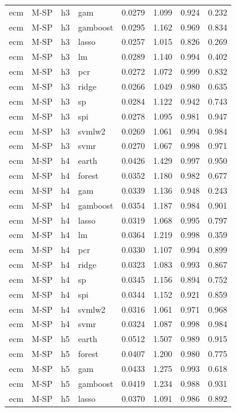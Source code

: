 \begin{ThreePartTable}
\begin{longtable}[t]{llclcccc}
ecm & M-SP & h3 & gam & 0.0279 & 1.099 & 0.924 & 0.232\\
ecm & M-SP & h3 & gamboost & 0.0295 & 1.162 & 0.969 & 0.834\\
ecm & M-SP & h3 & lasso & 0.0257 & 1.015 & 0.826 & 0.269\\
ecm & M-SP & h3 & lm & 0.0289 & 1.140 & 0.994 & 0.402\\
ecm & M-SP & h3 & pcr & 0.0272 & 1.072 & 0.999 & 0.832\\
ecm & M-SP & h3 & ridge & 0.0266 & 1.049 & 0.980 & 0.635\\
ecm & M-SP & h3 & sp & 0.0284 & 1.122 & 0.942 & 0.743\\
ecm & M-SP & h3 & spi & 0.0278 & 1.095 & 0.981 & 0.947\\
ecm & M-SP & h3 & svmlw2 & 0.0269 & 1.061 & 0.994 & 0.984\\
ecm & M-SP & h3 & svmr & 0.0270 & 1.067 & 0.998 & 0.971\\
\addlinespace
ecm & M-SP & h4 & earth & 0.0426 & 1.429 & 0.997 & 0.950\\
ecm & M-SP & h4 & forest & 0.0352 & 1.180 & 0.982 & 0.677\\
ecm & M-SP & h4 & gam & 0.0339 & 1.136 & 0.948 & 0.243\\
ecm & M-SP & h4 & gamboost & 0.0354 & 1.187 & 0.984 & 0.901\\
ecm & M-SP & h4 & lasso & 0.0319 & 1.068 & 0.995 & 0.797\\
ecm & M-SP & h4 & lm & 0.0364 & 1.219 & 0.998 & 0.359\\
ecm & M-SP & h4 & pcr & 0.0330 & 1.107 & 0.994 & 0.899\\
ecm & M-SP & h4 & ridge & 0.0323 & 1.083 & 0.993 & 0.867\\
ecm & M-SP & h4 & sp & 0.0345 & 1.156 & 0.894 & 0.752\\
ecm & M-SP & h4 & spi & 0.0344 & 1.152 & 0.921 & 0.859\\
ecm & M-SP & h4 & svmlw2 & 0.0316 & 1.061 & 0.971 & 0.968\\
ecm & M-SP & h4 & svmr & 0.0324 & 1.087 & 0.998 & 0.984\\
\addlinespace
ecm & M-SP & h5 & earth & 0.0512 & 1.507 & 0.989 & 0.915\\
ecm & M-SP & h5 & forest & 0.0407 & 1.200 & 0.980 & 0.775\\
ecm & M-SP & h5 & gam & 0.0433 & 1.275 & 0.993 & 0.618\\
ecm & M-SP & h5 & gamboost & 0.0419 & 1.234 & 0.988 & 0.931\\
ecm & M-SP & h5 & lasso & 0.0370 & 1.091 & 0.986 & 0.892\\

\end{longtable}
\end{ThreePartTable}
